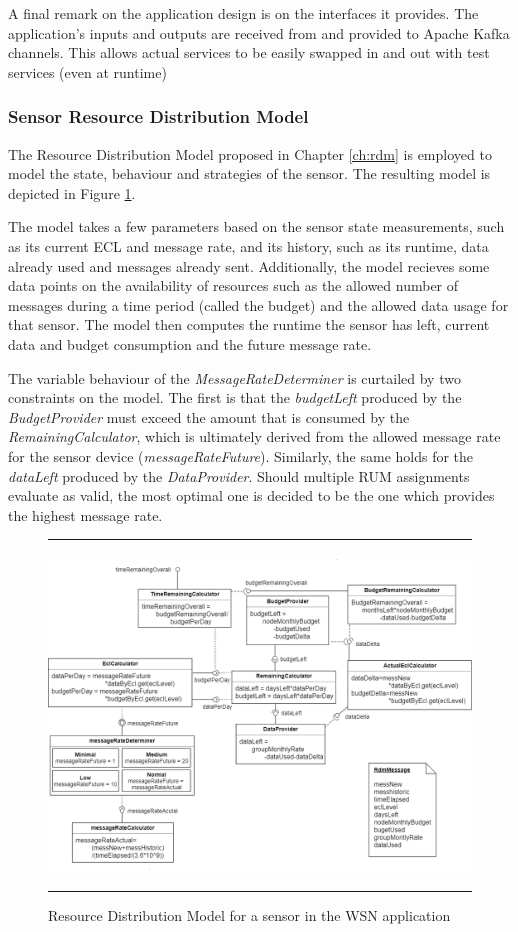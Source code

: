 A final remark on the application design is on the interfaces it provides. The application's inputs and outputs are received from and provided to Apache Kafka channels. This allows actual services to be easily swapped in and out with test services (even at runtime)

\subsubsection{Sensor Resource Distribution Model}
The Resource Distribution Model proposed in Chapter \ref{ch:rdm} is employed to model the state, behaviour and strategies of the sensor. The resulting model is depicted in Figure \ref{fig:sensit_rdm}. 

The model takes a few parameters based on the sensor state measurements, such as its current ECL and message rate, and its history, such as its runtime, data already used and messages already sent. Additionally, the model recieves some data points on the availability of resources such as the allowed number of messages during a time period (called the budget) and the allowed data usage for that sensor. The model then computes the runtime the sensor has left, current data and budget consumption and the future message rate. 

The variable behaviour of the \emph{MessageRateDeterminer} is curtailed by two constraints on the model. The first is that the \emph{budgetLeft} produced by the \emph{BudgetProvider} must exceed the amount that is consumed by the \emph{RemainingCalculator}, which is ultimately derived from the allowed message rate for the sensor device (\emph{messageRateFuture}). Similarly, the same holds for the \emph{dataLeft} produced by the \emph{DataProvider}. Should multiple RUM assignments evaluate as valid, the most optimal one is decided to be the one which provides the highest message rate.

\begin{figure}
\centering
\hrule
\includegraphics[width=\textwidth]{resources/img/sensit_rdm.png}
\hrule
\caption{Resource Distribution Model for a sensor in the \idsystems\sensit WSN application}
\label{fig:sensit_rdm}
\end{figure}

